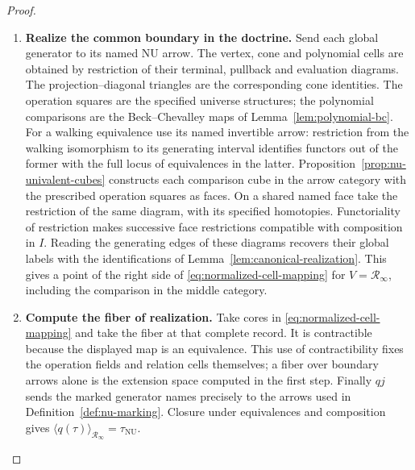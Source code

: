 \documentclass[oneside]{article}
\theoremstyle{plain}
\theoremstyle{definition}
\theoremstyle{remark}
\newcommand{\NU}{\mathrm{NU}}
\newcommand{\RNU}{\mathcal R_{\infty}}
\begin{document}
\begin{proof}
\begin{enumerate}
\item \textbf{Realize the common boundary in the doctrine.}
Send each global generator to its named NU arrow. The vertex, cone
and polynomial cells are obtained by restriction of their terminal,
pullback and evaluation diagrams. The projection--diagonal triangles
are the corresponding cone identities. The operation squares are the
specified universe structures; the polynomial comparisons are the
Beck--Chevalley maps of Lemma~\ref{lem:polynomial-bc}. For a walking
equivalence use its named invertible arrow: restriction from the
walking isomorphism to its generating interval identifies functors out
of the former with the full locus of equivalences in the latter.
Proposition~\ref{prop:nu-univalent-cubes} constructs each comparison
cube in the arrow category with the prescribed operation squares as
faces. On a shared named face take the restriction of the same
diagram, with its specified homotopies. Functoriality of restriction
makes successive face restrictions compatible with composition in
$I$. Reading the generating edges of these diagrams recovers their
global labels with the identifications of
Lemma~\ref{lem:canonical-realization}. This gives a point of the right
side of \eqref{eq:normalized-cell-mapping} for $V=\RNU$, including
the comparison in the middle category.

\item \textbf{Compute the fiber of realization.}
Take cores in \eqref{eq:normalized-cell-mapping} and take the fiber
at that complete record. It is contractible because the displayed
map is an equivalence. This use of contractibility fixes the operation
fields and relation cells themselves; a fiber over boundary arrows
alone is the extension space computed in the first step. Finally
$qj$ sends the marked generator names precisely to the arrows used
in Definition~\ref{def:nu-marking}. Closure under equivalences and
composition gives $\langle q(\tau)\rangle_{\RNU}=\tau_{\NU}$.
\qedhere
\end{enumerate}
\end{proof}
\end{document}
